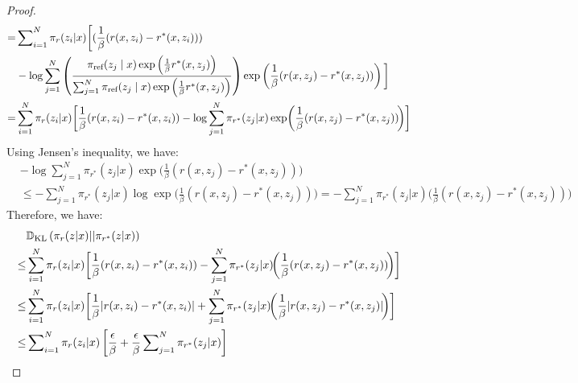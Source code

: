 \documentclass{article} %
\begin{document}
\begin{proof}
\begin{align*}
    =&\sum\nolimits^{N}_{i=1}\pi_{r}(z_i|x)\bigg[(\frac{1}{\beta}(r(x,z_i)-r^{*}(x,z_i)))\\&-\log\sum^{N}_{j=1}\left(\frac{\pi_\text{ref}(z_j\mid x)\exp\left(\frac{1}{\beta}r^{*}(x, z_j)\right)}{\sum^{N}_{j=1}\pi_\text{ref}(z_j\mid x)\exp\left(\frac{1}{\beta}r^{*}(x, z_j)\right)}\right)\exp\left(\frac{1}{\beta}(r(x,z_j)-r^{*}(x, z_j))\right)\bigg]\\
    =&\sum\limits^{N}_{i=1}\pi_{r}(z_i|x)\bigg[\frac{1}{\beta}(r(x,z_i)-r^{*}(x,z_i))-\log\sum\limits^{N}_{j=1}\pi_{r^{*}}(z_j|x)\exp\!\bigg(\frac{1}{\beta}(r(x,z_j)-r^{*}(x,z_j))\!\bigg)\bigg]
    \end{align*}
    Using Jensen's inequality, we have:
    \begin{align*}
        &-\log\sum\limits^{N}_{j=1}\pi_{r^{*}}(z_j|x)\exp\!\bigg(\frac{1}{\beta}(r(x,z_j)-r^{*}(x,z_j))\!\bigg)\\
        &\leq -\sum\limits^{N}_{j=1}\pi_{r^{*}}(z_j|x)\log\exp\!\bigg(\frac{1}{\beta}(r(x,z_j)-r^{*}(x,z_j))\!\bigg)=-\sum\limits^{N}_{j=1}\pi_{r^{*}}(z_j|x)\!\bigg(\frac{1}{\beta}(r(x,z_j)-r^{*}(x,z_j))\!\bigg)
    \end{align*}
Therefore, we have:
\begin{align*}
    &\mathbb{D}_{\textrm{KL}}\left(\pi_{r}(z|x)||\pi_{r^{*}}(z|x)\right)\\
    \leq&\sum\limits^{N}_{i=1}\pi_{r}(z_i|x)\bigg[\frac{1}{\beta}(r(x,z_i)-r^{*}(x,z_i))-\sum\limits^{N}_{j=1}\pi_{r^{*}}(z_j|x)\!\bigg(\frac{1}{\beta}(r(x,z_j)-r^{*}(x,z_j))\!\bigg)\bigg]\\
    \leq&\sum\limits^{N}_{i=1}\pi_{r}(z_i|x)\bigg[\frac{1}{\beta}|r(x,z_i)-r^{*}(x,z_i)|+\sum\limits^{N}_{j=1}\pi_{r^{*}}(z_j|x)\!\bigg(\frac{1}{\beta}|r(x,z_j)-r^{*}(x,z_j)|\!\bigg)\bigg]\\
    \leq&\sum\nolimits^{N}_{i=1}\pi_{r}(z_i|x)\left[\frac{\epsilon}{\beta}+\frac{\epsilon}{\beta}\sum\nolimits^{N}_{j=1}\pi_{r^{*}}(z_j|x)\right]
\end{align*}

\end{proof}
\end{document}
